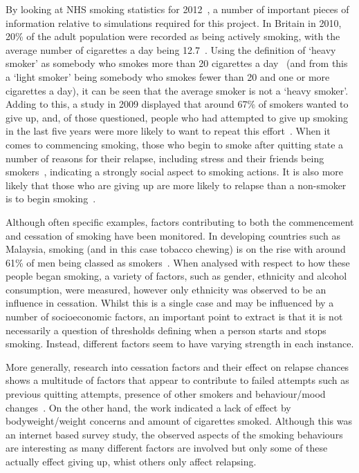 \documentclass[]{report}
\begin{document}
By looking at NHS smoking statistics for 2012~\cite{NHS-13}, a number of important pieces of information relative to simulations required for this project. In Britain in 2010, 20\% of the adult population were recorded as being actively smoking, with the average number of cigarettes a day being 12.7~\cite{NHS-13}. Using the definition of `heavy smoker' as somebody who smokes more than 20 cigarettes a day~\cite{NHS-14} (and from this a `light smoker' being somebody who smokes fewer than 20 and one or more cigarettes a day), it can be seen that the average smoker is not a `heavy smoker'. Adding to this, a study in 2009 displayed that around 67\% of smokers wanted to give up, and, of those questioned, people who had attempted to give up smoking in the last five years were more likely to want to repeat this effort~\cite{SmokOmni}. When it comes to commencing smoking, those who begin to smoke after quitting state a number of reasons for their relapse, including stress and their friends being smokers~\cite{NHS-43}, indicating a strongly social aspect to smoking actions. It is also more likely that those who are giving up are more likely to relapse than a non-smoker is to begin smoking~\cite{NHS-43}.

Although often specific examples, factors contributing to both the commencement and cessation of smoking have been monitored. In developing countries such as Malaysia, smoking (and in this case tobacco chewing) is on the rise with around 61\% of men being classed as smokers~\cite{malay}. When analysed with respect to how these people began smoking, a variety of factors, such as gender, ethnicity and alcohol consumption, were measured, however only ethnicity was observed to be an influence in cessation. Whilst this is a single case and may be influenced by a number of socioeconomic factors, an important point to extract is that it is not necessarily a question of thresholds defining when a person starts and stops smoking. Instead, different factors seem to have varying strength in each instance.

More generally, research into cessation factors and their effect on relapse chances shows a multitude of factors that appear to contribute to failed attempts such as previous quitting attempts, presence of other smokers and behaviour/mood changes~\cite{UCL-cess}. On the other hand, the work indicated a lack of effect by bodyweight/weight concerns and amount of cigarettes smoked. Although this was an internet based survey study, the observed aspects of the smoking behaviours are interesting as many different factors are involved but only some of these actually effect giving up, whist others only affect relapsing.
\end{document}
